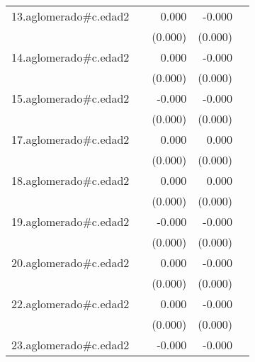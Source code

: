 {\begin{longtable}{l*{4}{D{.}{.}{-1}}}
\addlinespace
13.aglomerado#c.edad2&                     &       0.000         &      -0.000         &                     \\
            &                     &     (0.000)         &     (0.000)         &                     \\
\addlinespace
14.aglomerado#c.edad2&                     &       0.000         &      -0.000         &                     \\
            &                     &     (0.000)         &     (0.000)         &                     \\
\addlinespace
15.aglomerado#c.edad2&                     &      -0.000         &      -0.000\sym{*}  &                     \\
            &                     &     (0.000)         &     (0.000)         &                     \\
\addlinespace
17.aglomerado#c.edad2&                     &       0.000         &       0.000         &                     \\
            &                     &     (0.000)         &     (0.000)         &                     \\
\addlinespace
18.aglomerado#c.edad2&                     &       0.000         &       0.000         &                     \\
            &                     &     (0.000)         &     (0.000)         &                     \\
\addlinespace
19.aglomerado#c.edad2&                     &      -0.000         &      -0.000         &                     \\
            &                     &     (0.000)         &     (0.000)         &                     \\
\addlinespace
20.aglomerado#c.edad2&                     &       0.000         &      -0.000         &                     \\
            &                     &     (0.000)         &     (0.000)         &                     \\
\addlinespace
22.aglomerado#c.edad2&                     &       0.000         &      -0.000         &                     \\
            &                     &     (0.000)         &     (0.000)         &                     \\
\addlinespace
23.aglomerado#c.edad2&                     &      -0.000         &      -0.000         &                     \\

\end{longtable}}
